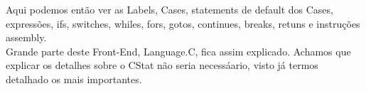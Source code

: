 Aqui podemos então ver as Labels, Cases, statements de default dos Cases, expressões, ifs, switches,
whiles, fors, gotos, continues, breaks, retuns e instruções assembly.\\

Grande parte deste Front-End, Language.C, fica assim explicado. Achamos que explicar os detalhes
sobre o \textrm{CStat} não seria necessáario, visto já termos detalhado os mais importantes.

